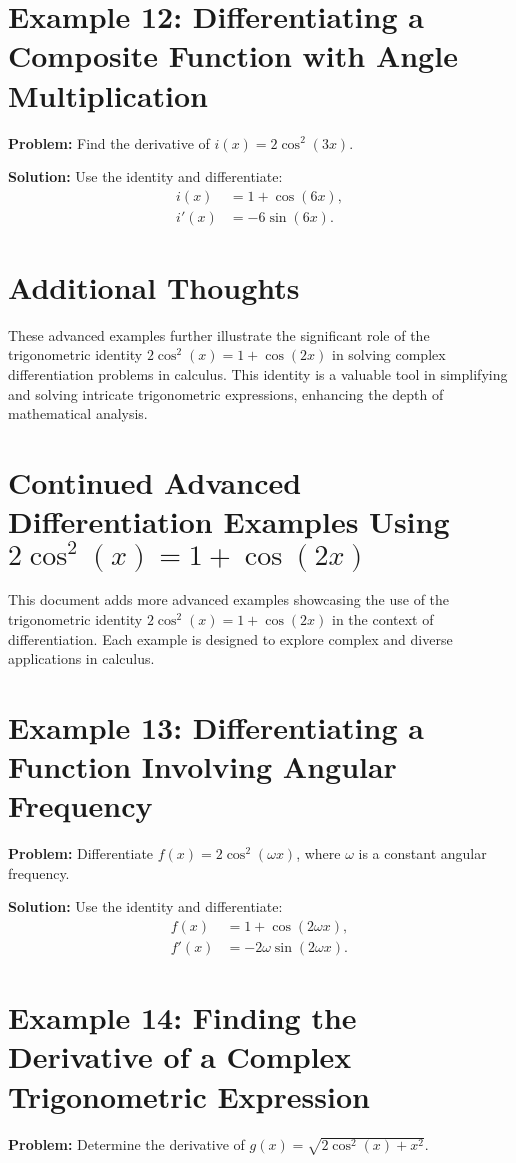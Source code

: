 \documentclass[a4paper,12pt]{book}
\newcounter{problem}
\newcounter{example}
\begin{document}
\section*{Example 12: Differentiating a Composite Function with Angle Multiplication}
\textbf{Problem:} Find the derivative of \(i(x) = 2 \cos^2(3x)\).

\textbf{Solution:}
Use the identity and differentiate:
\begin{align*}
i(x) &= 1 + \cos(6x), \\
i'(x) &= -6 \sin(6x).
\end{align*}

\section*{Additional Thoughts}
These advanced examples further illustrate the significant role of the trigonometric identity \(2 \cos^2(x) = 1 + \cos(2x)\) in solving complex differentiation problems in calculus. This identity is a valuable tool in simplifying and solving intricate trigonometric expressions, enhancing the depth of mathematical analysis.

\section*{Continued Advanced Differentiation Examples Using \(2 \cos^2(x) = 1 + \cos(2x)\)}
This document adds more advanced examples showcasing the use of the trigonometric identity \(2 \cos^2(x) = 1 + \cos(2x)\) in the context of differentiation. Each example is designed to explore complex and diverse applications in calculus.

\section*{Example 13: Differentiating a Function Involving Angular Frequency}
\textbf{Problem:} Differentiate \(f(x) = 2 \cos^2(\omega x)\), where \(\omega\) is a constant angular frequency.

\textbf{Solution:}
Use the identity and differentiate:
\begin{align*}
f(x) &= 1 + \cos(2\omega x), \\
f'(x) &= -2\omega \sin(2\omega x).
\end{align*}

\section*{Example 14: Finding the Derivative of a Complex Trigonometric Expression}
\textbf{Problem:} Determine the derivative of \(g(x) = \sqrt{2 \cos^2(x) + x^2}\).
\end{document}
